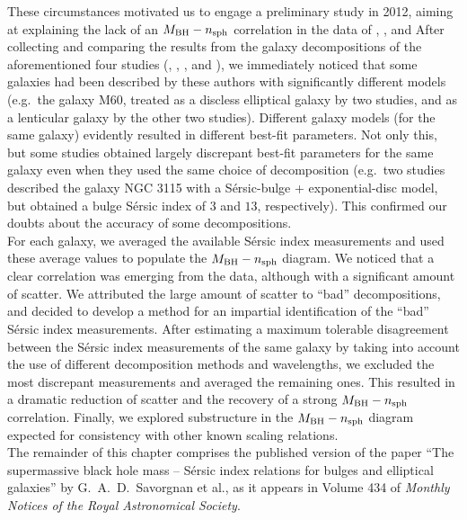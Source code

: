 These circumstances motivated us to engage a preliminary study in 2012, 
aiming at explaining the lack of an $M_{\rm BH} - n_{\rm sph}$ correlation 
in the data of \citeauthor{sani2011}, \citeauthor{vika2012}, and \citeauthor{beifiori2012} 
After collecting and comparing the results from the galaxy decompositions 
of the aforementioned four studies (\citeauthor{grahamdriver2007}, \citeauthor{sani2011}, 
\citeauthor{vika2012}, and \citeauthor{beifiori2012}), 
we immediately noticed that some galaxies had been described by these authors with significantly different models 
(e.g.~the galaxy M60, treated as a discless elliptical galaxy by two studies, 
and as a lenticular galaxy by the other two studies). 
Different galaxy models (for the same galaxy) evidently resulted in different best-fit parameters. 
Not only this, but some studies obtained largely discrepant best-fit parameters 
for the same galaxy even when they used the same choice of decomposition 
(e.g.~two studies described the galaxy NGC 3115 with a S\'ersic-bulge + exponential-disc model, 
but obtained a bulge S\'ersic index of $3$ and $13$, respectively). 
This confirmed our doubts about the accuracy of some decompositions. \\

For each galaxy, we averaged the available S\'ersic index measurements 
and used these average values to populate the $M_{\rm BH} - n_{\rm sph}$ diagram. 
We noticed that a clear correlation was emerging from the data, 
although with a significant amount of scatter. 
We attributed the large amount of scatter to ``bad'' decompositions, 
and decided to develop a method for an impartial identification of the ``bad'' S\'ersic index measurements. 
After estimating a maximum tolerable disagreement between the S\'ersic index measurements of the same galaxy 
by taking into account the use of different decomposition methods and wavelengths, 
we excluded the most discrepant measurements and averaged the remaining ones. 
This resulted in a dramatic reduction of scatter 
and the recovery of a strong $M_{\rm BH} - n_{\rm sph}$ correlation. 
Finally, we explored substructure in the $M_{\rm BH} - n_{\rm sph}$ diagram 
expected for consistency with other known scaling relations. \\

The remainder of this chapter comprises the published version of the paper 
``The supermassive black hole mass -- S\'ersic index relations for bulges and elliptical galaxies''
by G.~A.~D.~Savorgnan et al., 
as it appears in Volume 434 of \emph{Monthly Notices of the Royal Astronomical Society}. 



